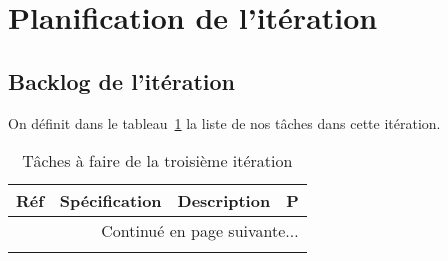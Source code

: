 \section{Planification de l'itération}

\subsection{Backlog de l'itération}

On définit dans le tableau~\ref{tab:sprint3-backlog} la liste de nos tâches
dans cette itération.

\begin{center}
    \footnotesize
    \begin{longtable}{| p{1cm} | p{5cm} | p{7cm} | l |}
        \caption{Tâches à faire de la troisième itération}
\label{tab:sprint3-backlog} \\

 \hline
 \multicolumn{1}{|c}{\textbf{Réf}} &
 \multicolumn{1}{|c}{\textbf{Spécification}} &
 \multicolumn{1}{|c}{\textbf{Description}} &
 \multicolumn{1}{|c|}{\textbf{P}} \\ \hline
 \endhead

 \hline \multicolumn{4}{|r|}{{Continué en page suivante$\dotsc$}} \\ \hline
 \endfoot

 \hline \hline
 \endlastfoot


\end{longtable}
\end{center}
